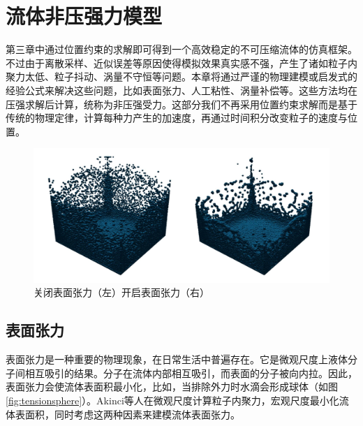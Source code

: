 \section{流体非压强力模型}
    第三章中通过位置约束的求解即可得到一个高效稳定的不可压缩流体的仿真框架。不过由于离散采样、近似误差等原因使得模拟效果真实感不强，产生了诸如粒子内聚力太低、粒子抖动、涡量不守恒等问题。本章将通过严谨的物理建模或启发式的经验公式来解决这些问题，比如表面张力、人工粘性、涡量补偿等。这些方法均在压强求解后计算，统称为非压强受力。这部分我们不再采用位置约束求解而是基于传统的物理定律，计算每种力产生的加速度，再通过时间积分改变粒子的速度与位置。
    
    \begin{figure}[htbp]
    	\centering
    	\includegraphics[width=.99\textwidth]{figures/simulation/tension.pdf}
    	\caption{关闭表面张力（左）开启表面张力（右）}
    \end{figure}

\subsection{表面张力}
    表面张力是一种重要的物理现象，在日常生活中普遍存在。它是微观尺度上液体分子间相互吸引的结果。分子在流体内部相互吸引，而表面的分子被向内拉。因此，表面张力会使流体表面积最小化，比如，当排除外力时水滴会形成球体（如图\ref{fig:tensionsphere}）。Akinci等人\cite{AAT13SPH}在微观尺度计算粒子内聚力，宏观尺度最小化流体表面积，同时考虑这两种因素来建模流体表面张力。

